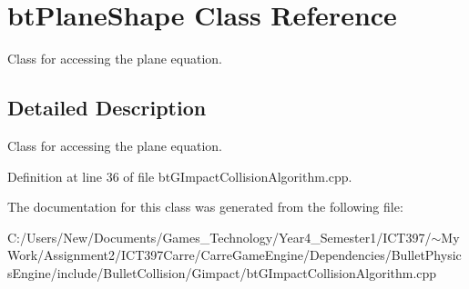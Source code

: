 \hypertarget{classbt_plane_shape}{
\section{btPlaneShape Class Reference}
\label{classbt_plane_shape}
}
Class for accessing the plane equation.  




\subsection{Detailed Description}
Class for accessing the plane equation. 

Definition at line 36 of file btGImpactCollisionAlgorithm.cpp.

The documentation for this class was generated from the following file:\begin{CompactItemize}
\item 
C:/Users/New/Documents/Games\_\-Technology/Year4\_\-Semester1/ICT397/$\sim$My Work/Assignment2/ICT397Carre/CarreGameEngine/Dependencies/BulletPhysicsEngine/include/BulletCollision/Gimpact/btGImpactCollisionAlgorithm.cpp\end{CompactItemize}

